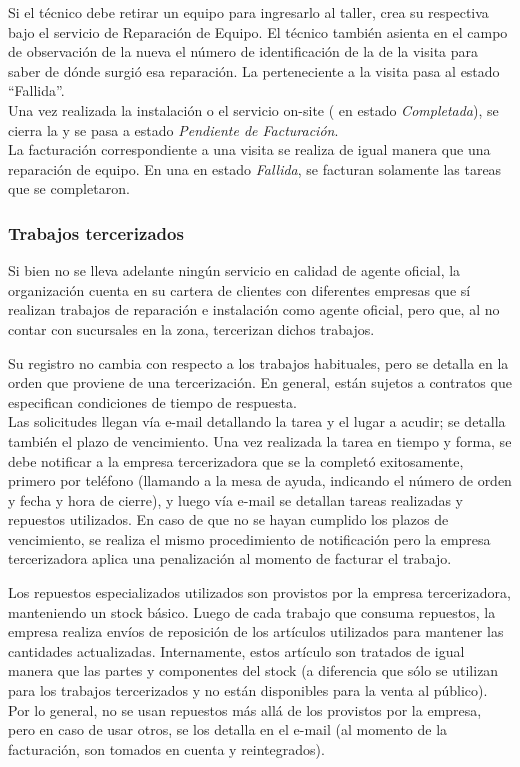 \documentclass[12pt]{extarticle}
\begin{document}
\begin{spacing}{1.2}
    Si el técnico debe retirar un equipo para ingresarlo al taller, crea su respectiva \OT{} bajo el servicio de Reparación de Equipo. El técnico también asienta en el campo de observación de la nueva \OT{} el número de identificación de la \OT{} de la visita para saber de dónde surgió esa reparación. La \OT{} perteneciente a la visita pasa al estado ``Fallida''.\\

    Una vez realizada la instalación o el servicio on-site (\OT{} en estado \textit{Completada}), se cierra la \OT{} y se pasa a estado \textit{Pendiente de Facturación}.\\

    La facturación correspondiente a una visita se realiza de igual manera que una reparación de equipo. En una \OT{} en estado \textit{Fallida}, se facturan solamente las tareas que se completaron.

    \subsubsection{Trabajos tercerizados}
    Si bien no se lleva adelante ningún servicio en calidad de agente oficial, la organización cuenta en su cartera de clientes con diferentes empresas que sí realizan trabajos de reparación e instalación como agente oficial, pero que, al no contar con sucursales en la zona, tercerizan dichos trabajos.

    Su registro no cambia con respecto a los trabajos habituales, pero se detalla en la orden que proviene de una tercerización.
    En general, están sujetos a contratos que especifican condiciones de tiempo de respuesta.\\

    Las solicitudes llegan vía e-mail detallando la tarea y el lugar a acudir; se detalla también el plazo de vencimiento.
    Una vez realizada la tarea en tiempo y forma, se debe notificar a la empresa tercerizadora que se la completó exitosamente, primero por teléfono (llamando a la mesa de ayuda, indicando el número de orden y fecha y hora de cierre), y luego vía e-mail se detallan tareas realizadas y repuestos utilizados.
    En caso de que no se hayan cumplido los plazos de vencimiento, se realiza el mismo procedimiento de notificación pero la empresa tercerizadora aplica una penalización al momento de facturar el trabajo.

    Los repuestos especializados utilizados son provistos por la empresa tercerizadora, manteniendo un stock básico. Luego de cada trabajo que consuma repuestos, la empresa realiza envíos de reposición de los artículos utilizados para mantener las cantidades actualizadas. 
    Internamente, estos artículo son tratados de igual manera que las partes y componentes del stock (a diferencia que sólo se utilizan para los trabajos tercerizados y no están disponibles para la venta al público).
    Por lo general, no se usan repuestos más allá de los provistos por la empresa, pero en caso de usar otros, se los detalla en el e-mail (al momento de la facturación, son tomados en cuenta y reintegrados).\\


\end{spacing}
\end{document}

